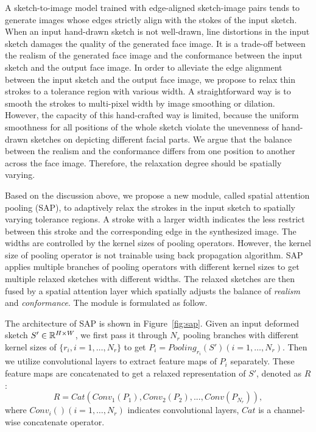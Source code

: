 
 
A sketch-to-image model trained with edge-aligned sketch-image pairs tends to generate images whose edges strictly align with the stokes of the input sketch.
When an input hand-drawn sketch is not well-drawn, line distortions in the input sketch damages the quality of the generated face image. 
It is a trade-off between the realism of the generated face image and the conformance between the input sketch and the output face image.
%
In order to alleviate the edge alignment between the input sketch and the output face image, we propose to relax thin strokes to a tolerance region with various width.
%
A straightforward way is to smooth the strokes to multi-pixel width by image smoothing or dilation. 
%
However, the capacity of this hand-crafted way is limited, because the uniform smoothness for all positions of the whole sketch violate the unevenness of hand-drawn sketches on depicting different facial parts. 
%
We argue that the balance between the realism and the conformance differs from one position to another across the face image. Therefore, the relaxation degree should be spatially varying. 


Based on the discussion above, we propose a new module, called spatial attention pooling (SAP), to adaptively relax the strokes in the input sketch to spatially varying tolerance regions. 
%
A stroke with a larger width indicates the less restrict between this stroke and the corresponding edge in the synthesized image. The widths are controlled by the kernel sizes of pooling operators. However, the kernel size of pooling operator is not trainable using back propagation algorithm. SAP applies multiple branches of pooling operators with different kernel sizes to get multiple relaxed sketches with different widths. The relaxed sketches are then fused by a spatial attention layer which spatially adjusts the balance of \textit{realism} and \textit{conformance}. The module is formulated as follow.

The architecture of SAP is shown in Figure~\ref{fig:sap}.
Given an input deformed sketch $S'\in {\mathbb{R}}^{H\times W}$, we first pass it through $N_r$ pooling branches with different kernel sizes of $\{r_i, i=1,\ldots, N_r\}$ to get $P_{i}=Pooling_{r_i}(S') (i=1,\ldots,N_r)$. 
Then we utilize convolutional layers to extract feature maps of $P_i$ separately. These feature maps are concatenated to get a relaxed representation of $S'$, denoted as $R$:
%
\begin{equation}
R=Cat(Conv_1(P_1), Conv_2(P_2),..., Conv(P_{N_r})),
\end{equation}
where $Conv_i() (i=1,\ldots,N_r)$ indicates convolutional layers, $Cat$ is a channel-wise concatenate operator.

